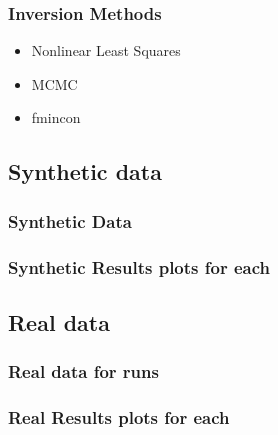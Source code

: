 \documentclass[7pt]{beamer}
\begin{document}
\begin{frame}
 \frametitle{Inversion Methods}

\begin{itemize}
\item Nonlinear Least Squares
\item MCMC
\item fmincon
\end{itemize}

\end{frame}


% 
\subsection{Synthetic data}
\begin{frame}
 \frametitle{Synthetic Data}
\end{frame}

% 
\begin{frame}
 \frametitle{Synthetic Results plots for each}
\end{frame}

\subsection{Real data}
% 
\begin{frame}
 \frametitle{Real data for runs}
\end{frame}

% 
\begin{frame}
 \frametitle{Real Results plots for each}
\end{frame}

\end{document}
